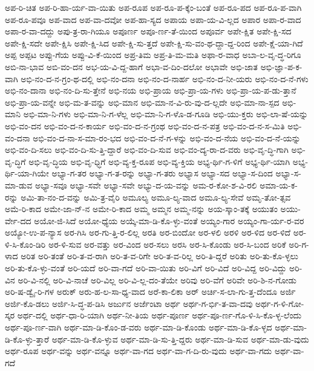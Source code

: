 {ಅಪ-ರಿ-ಚಿತ
ಅಪ-ರಿ-ಹಾ-ರ್ಯ-ವಾ-ಯಿತು
ಅಪ-ರೂಪ
ಅಪ-ರೂ-ಪ-ಕ್ಕೆಂ-ಬಂತೆ
ಅಪ-ರೂ-ಪದ
ಅಪ-ರೂ-ಪ-ವಾಗಿ
ಅಪ-ರೂ-ಪವೂ
ಅಪ-ವಾದ
ಅಪ-ವಾ-ದವೋ
ಅಪ-ಹಾ-ಸ್ಯದ
ಅಪಾಯ
ಅಪಾ-ಯ-ವಿ-ಲ್ಲದ
ಅಪಾರ
ಅಪಾ-ರ-ವಾದ
ಅಪಾ-ರ-ವಾ-ದದ್ದು
ಅಪು-ತ್ರ-ರಾ-ಗಿಯೂ
ಅಪೂರ್ಣ
ಅಪೂ-ರ್ಣ-ತೆ-ಯಿಂದ
ಅಪೂರ್ವ
ಅಪೇ-ಕ್ಷಿತ
ಅಪೇ-ಕ್ಷಿ-ಸದ
ಅಪೇ-ಕ್ಷಿ-ಸದೇ
ಅಪೇ-ಕ್ಷಿಸಿ
ಅಪೇ-ಕ್ಷಿ-ಸಿದ
ಅಪೇ-ಕ್ಷಿ-ಸು-ತ್ತದೆ
ಅಪೇ-ಕ್ಷಿ-ಸು-ವಂ-ಥ-ದ್ದಾ-ದ್ದ-ರಿಂದ
ಅಪೇ-ಕ್ಷೆ-ಯಾ-ಗಿದೆ
ಅಪ್ಪ
ಅಪ್ಪಟ
ಅಪ್ಪು-ಗೆಯ
ಅಪ್ಪು-ವಿ-ಕೆ-ಯಿಂದ
ಅಪ್ರ-ತಿಮ
ಅಪ್ರ-ತಿ-ಮ-ಮತಿ
ಅಫಾ-ರ-ವಾಧ
ಅಬಾ-ಲ-ವೃ-ದ್ಧ-ರಿಗೂ
ಅಬಿ-ನಾ-ಭಾವ
ಅಬಿ-ವಂ-ದನ
ಅಭ-ಯ-ವಿ-ದ್ದ-ಹಾಗೆ
ಅಭಾ-ವ-ದಿಂ-ದಲೋ
ಅಭಾವೇ
ಅಭಿ-ಜಾತ
ಅಭಿ-ಜ್ಞಾ-ಪ-ಕ-ವಾಗಿ
ಅಭಿ-ನಂ-ದ-ನ-ಗ್ರಂ-ಥ-ದಲ್ಲಿ
ಅಭಿ-ನಂ-ದನಾ
ಅಭಿ-ನಂ-ದ-ನಾರ್ಹ
ಅಭಿ-ನಂ-ದ-ನೀ-ಯರು
ಅಭಿ-ನಂ-ದ-ನೆ-ಗಳು
ಅಭಿ-ನಂ-ದಾನಾ
ಅಭಿ-ನಂ-ದಿ-ಸು-ತ್ತೇನೆ
ಅಭಿ-ನಯ
ಅಭಿ-ಪ್ರಾಯ
ಅಭಿ-ಪ್ರಾ-ಯ-ಗಳು
ಅಭಿ-ಪ್ರಾ-ಯ-ಪ-ಡು-ತ್ತಾನೆ
ಅಭಿ-ಪ್ರಾ-ಯ-ವನ್ನೇ
ಅಭಿ-ಮ-ತ-ವನ್ನು
ಅಭಿ-ಮಾನ
ಅಭಿ-ಮಾ-ನ-ವಿ-ರು-ವು-ದ-ಲ್ಲದೇ
ಅಭಿ-ಮಾ-ನಾ-ಸ್ಪದ
ಅಭಿ-ಮಾನಿ
ಅಭಿ-ಮಾ-ನಿ-ಗಳು
ಅಭಿ-ಮಾ-ನಿ-ಗ-ಳೆಲ್ಲ
ಅಭಿ-ಮಾ-ನಿ-ಗ-ಳೊ-ಡ-ಗೂಡಿ
ಅಭಿ-ಯು-ಕ್ತರು
ಅಭಿ-ಲಾ-ಷೆ-ಯನ್ನು
ಅಭಿ-ವಂ-ದನ
ಅಭಿ-ವಂ-ದ-ನ-ಕಾರ್ಯ
ಅಭಿ-ವಂ-ದ-ನ-ಗ್ರಂಥ
ಅಭಿ-ವಂ-ದ-ನ-ಪತ್ರ
ಅಭಿ-ವಂ-ದ-ನ-ಸ-ಮಿತಿ
ಅಭಿ-ವಂ-ದನಾ
ಅಭಿ-ವಂ-ದ-ನಾ-ಸ-ಮಾ-ರಂ-ಭದ
ಅಭಿ-ವಂ-ದ-ನೆ-ಗ-ಳನ್ನು
ಅಭಿ-ವಂ-ದ-ನೆಯ
ಅಭಿ-ವಂ-ದ-ನೆ-ಯನ್ನು
ಅಭಿ-ವಂ-ದಿ-ಸಲು
ಅಭಿ-ವಂ-ದಿ-ಸು-ತ್ತಿ-ದ್ದಾರೆ
ಅಭಿ-ವಂ-ದಿ-ಸುವ
ಅಭಿ-ವಂ-ದ್ಯ-ರಾ-ದ-ವರು
ಅಭಿ-ವೃ-ದ್ಧಿ-ಗಾಗಿ
ಅಭಿ-ವೃ-ದ್ಧಿಗೆ
ಅಭಿ-ವೃ-ದ್ಧಿಯ
ಅಭಿ-ವೃ-ಧ್ಧಿಗೆ
ಅಭಿ-ವ್ಯ-ಕ್ತ-ರೂಪ
ಅಭಿ-ವ್ಯ-ಕ್ತಿಯ
ಅಭ್ಯ-ರ್ಥಿ-ಗ-ಳಿಗೆ
ಅಭ್ಯ-ರ್ಥಿ-ಯಾಗಿ
ಅಭ್ಯ-ರ್ಥಿ-ಯಾ-ಗಿಯೇ
ಅಭ್ಯಾ-ಗ-ತರ
ಅಭ್ಯಾ-ಗ-ತ-ರನ್ನು
ಅಭ್ಯಾ-ಗ-ತರು
ಅಭ್ಯಾಸ
ಅಭ್ಯಾ-ಸದ
ಅಭ್ಯಾ-ಸ-ದಿಂದ
ಅಭ್ಯಾ-ಸ-ಮಾ-ಡುವ
ಅಭ್ಯಾ-ಸವೂ
ಅಭ್ಯಾ-ಸವೇ
ಅಭ್ಯಾ-ಸವೇ
ಅಭ್ಯು-ದ-ಯ-ವನ್ನು
ಅಮ-ರ-ಕೋ-ಶ-ವಿ-ರಲಿ
ಅಮಾ-ಯ-ಕ-ರನ್ನು
ಅಮಿ-ತಾ-ನಂ-ದ-ವನ್ನು
ಅಮಿ-ತ್ರ-ವೈರಿ
ಅಮೂಲ್ಯ
ಅಮೂ-ಲ್ಯ-ವಾದ
ಅಮೂ-ಲ್ಯ-ಸೇವೆ
ಅಮೃ-ತೋ-ತ್ಸವ
ಅಮೆ-ರಿ-ಕಾದ
ಅಮೇ-ಜಾ-ನ್-ನ
ಅಮೇ-ರಿ-ಕಾದ
ಅಮ್ಮ
ಅಮ್ಮನ
ಅಮ್ಮ-ನನ್ನು
ಅಯ-ಸ್ಕಾಂ-ತಕ್ಕೆ
ಅಯುತಂ
ಅಯು-ರ್ವೇ-ದದ
ಅಯೋ-ಜಿ-ಸಿದೆ
ಅಯೋ-ಧ್ಯೆಯ
ಅಯ್ಕೆ-ಮಾ-ಡಿ-ಕೊ-ಳ್ಳು-ವಂತೆ
ಅಯ್ಯಂ-ಗಾರ
ಅಯ್ಯಂ-ಗಾ-ರ್ಯ-ರ-ವರ
ಅಯ್ಯೋ-ಉ-ಪ-ನ್ಯಾಸ
ಅರ-ಗಿಸಿ
ಅರ-ಗು-ತ್ತಿ-ರ-ಲಿಲ್ಲ
ಅರತಿ
ಅರ-ಬಿಂದೋ
ಅರ-ಳಲಿ
ಅರಳಿ
ಅರ-ಳಿದ
ಅರ-ಳಿದೆ
ಅರ-ಳಿ-ಸಿ-ಕೊಂ-ಡಿರಿ
ಅರ-ಳಿ-ಸುವ
ಅರ-ವತ್ತು
ಅರ-ವಿಂದ
ಅರ-ಸಲು
ಅರಸಿ
ಅರ-ಸಿ-ಕೊಂಡು
ಅರ-ಸಿ-ಬಂದ
ಅರಿಕೆ
ಅರಿ-ಗ-ಳಾದ
ಅರಿತ
ಅರಿ-ತಂತೆ
ಅರಿ-ತ-ವ-ರಾಗಿ
ಅರಿ-ತ-ವ-ರಿಗೇ
ಅರಿ-ತ-ವ-ರಿಲ್ಲ
ಅರಿ-ತಿ-ದ್ದರೆ
ಅರಿತು
ಅರಿ-ತು-ಕೊ-ಳ್ಳಲು
ಅರಿ-ತು-ಕೊ-ಳ್ಳು-ವಂತೆ
ಅರಿ-ಯದೆ
ಅರಿ-ವಾ-ಗದೆ
ಅರಿ-ವಾ-ಯಿತು
ಅರಿ-ವಿಗೆ
ಅರಿ-ವಿದೆ
ಅರಿ-ವಿದ್ದ
ಅರಿ-ವಿದ್ದು
ಅರಿ-ವಿನ
ಅರಿ-ವಿ-ನಲ್ಲಿ
ಅರಿ-ವಿ-ನಾಚೆ
ಅರಿ-ವಿಲ್ಲ
ಅರಿ-ವಿ-ಲ್ಲ-ದಂ-ತೆಯೇ
ಅರಿವು
ಅರಿ-ವೆಗೆ
ಅರಿವೇ
ಅರಿ-ಶಿ-ನ-ಗೋಡು
ಅರಿ-ಷ-ಡ್ವೈ-ರಿ-ಗಳ
ಅರುಕ್
ಅರು-ಹ-ಲ-ಸಾ-ಧ್ಯ-ವಾದ
ಅರೆ-ಕಾ-ಲಿಕಾ
ಅರ್
ಅರ್ಚಿ-ಸ-ಲಾ-ಗು-ತ್ತ-ದೆಂದೂ
ಅರ್ಜಿ
ಅರ್ಜಿ-ಕೊ-ಡಲು
ಅರ್ಜಿ-ಸಿ-ದ್ಧ-ಪ-ಡಿಸಿ
ಅರ್ಜುನ
ಅರ್ಜೆಂಟಾ
ಅರ್ಥ
ಅರ್ಥ-ಗ-ರ್ಭಿ-ತ-ವಾ-ದವು
ಅರ್ಥ-ಗ-ಳಿ-ಗೋ-ಸ್ಕರ
ಅರ್ಥ-ದಲ್ಲಿ
ಅರ್ಥ-ಧಾ-ರಿ-ಯಾಗಿ
ಅರ್ಥ-ನೀ-ತಿಯ
ಅರ್ಥ-ಪೂರ್ಣ
ಅರ್ಥ-ಪೂ-ರ್ಣ-ಗೊ-ಳಿ-ಸಿ-ಕೊ-ಳ್ಳ-ಲೆಂದು
ಅರ್ಥ-ಪೂ-ರ್ಣ-ವಾಗಿ
ಅರ್ಥ-ಮಾ-ಡಿ-ಕೊಂ-ಡ-ವರು
ಅರ್ಥ-ಮಾ-ಡಿ-ಕೊಂಡು
ಅರ್ಥ-ಮಾ-ಡಿ-ಕೊ-ಳ್ಳದ
ಅರ್ಥ-ಮಾ-ಡಿ-ಕೊ-ಳ್ಳು-ತ್ತಾರೆ
ಅರ್ಥ-ಮಾ-ಡಿ-ಕೊ-ಳ್ಳುವ
ಅರ್ಥ-ಮಾ-ಡಿ-ಸು-ತ್ತಿ-ದ್ದರು
ಅರ್ಥ-ಮಾ-ಡಿ-ಸುವ
ಅರ್ಥ-ಮಾ-ಡು-ವುದು
ಅರ್ಥ-ರೂಪ
ಅರ್ಥ-ವನ್ನು
ಅರ್ಥ-ವನ್ನೂ
ಅರ್ಥ-ವಾ-ಗದ
ಅರ್ಥ-ವಾ-ಗ-ದಿ-ರು-ವುದು
ಅರ್ಥ-ವಾ-ಗದು
ಅರ್ಥ-ವಾ-ಗದೆ
}
